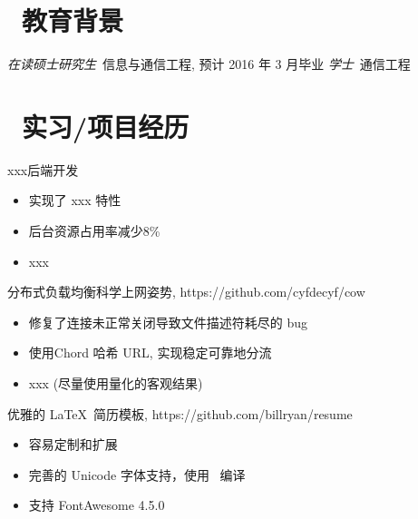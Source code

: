 \documentclass{resume}
\begin{document}


 
\section{\faGraduationCap\  教育背景}
\textit{在读硕士研究生}\ 信息与通信工程, 预计 2016 年 3 月毕业
\textit{学士}\ 通信工程

\section{\faUsers\ 实习/项目经历}
\role{实习}{经理: 高富帅}
xxx后端开发
\begin{itemize}
  \item 实现了 xxx 特性
  \item 后台资源占用率减少8\%
  \item xxx
\end{itemize}

\begin{onehalfspacing}
分布式负载均衡科学上网姿势, https://github.com/cyfdecyf/cow
\begin{itemize}
  \item 修复了连接未正常关闭导致文件描述符耗尽的 bug
  \item 使用Chord 哈希 URL, 实现稳定可靠地分流
  \item xxx (尽量使用量化的客观结果)
\end{itemize}
\end{onehalfspacing}

\begin{onehalfspacing}
优雅的 \LaTeX\ 简历模板, https://github.com/billryan/resume
\begin{itemize}
  \item 容易定制和扩展
  \item 完善的 Unicode 字体支持，使用 \XeLaTeX\ 编译
  \item 支持 FontAwesome 4.5.0
\end{itemize}
\end{onehalfspacing}
\end{document}
